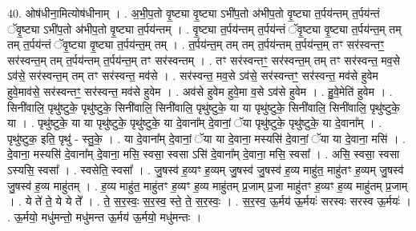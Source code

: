 \documentclass[17pt]{extarticle}
\begin{document}
40. ओष॑धीना॒मित्योष॑धीनाम् । . अ॒भी॒प॒तो वृ॒ष्ट्या वृ॒ष्ट्या ऽभी॑प॒तो अ॑भीप॒तो वृ॒ष्ट्या त॒र्पय॑न्तम् त॒र्पय॑न्तं 
ॅवृ॒ष्ट्या ऽभी॑प॒तो अ॑भीप॒तो वृ॒ष्ट्या त॒र्पय॑न्तम् । . वृ॒ष्ट्या त॒र्पय॑न्तम् त॒र्पय॑न्तं ॅवृ॒ष्ट्या वृ॒ष्ट्या त॒र्पय॑न्त॒म् तम् तम् त॒र्पय॑न्तं ॅवृ॒ष्ट्या वृ॒ष्ट्या त॒र्पय॑न्त॒म् तम् । . त॒र्पय॑न्त॒म् तम् तम् त॒र्पय॑न्तम् त॒र्पय॑न्त॒म् तꣳ सर॑स्वन्तꣳ॒॒ सर॑स्वन्त॒म् तम् त॒र्पय॑न्तम् त॒र्पय॑न्त॒म् तꣳ सर॑स्वन्तम् । . तꣳ सर॑स्वन्तꣳ॒॒ सर॑स्वन्त॒म् तम् तꣳ सर॑स्वन्त॒ मव॒से ऽव॑से॒ सर॑स्वन्त॒म् तम् तꣳ सर॑स्वन्त॒ मव॑से । . सर॑स्वन्त॒ मव॒से ऽव॑से॒ सर॑स्वन्तꣳ॒॒ सर॑स्वन्त॒ मव॑से हुवेम हुवे॒माव॑से॒ सर॑स्वन्तꣳ॒॒ सर॑स्वन्त॒ मव॑से हुवेम । . अव॑से हुवेम हुवे॒मा व॒से ऽव॑से हुवेम । . हु॒वे॒मेति॑ हुवेम । . सिनी॑वालि॒ पृथु॑ष्टुके॒ पृथु॑ष्टुके॒ सिनी॑वालि॒ सिनी॑वालि॒ पृथु॑ष्टुके॒ या या पृथु॑ष्टुके॒ सिनी॑वालि॒ सिनी॑वालि॒ पृथु॑ष्टुके॒ या । . पृथु॑ष्टुके॒ या या पृथु॑ष्टुके॒ पृथु॑ष्टुके॒ या दे॒वाना᳚म् दे॒वानां॒ ॅया पृथु॑ष्टुके॒ पृथु॑ष्टुके॒ या दे॒वाना᳚म् । . पृथु॑ष्टुक॒ इति॒ पृथु॑ - स्तु॒के॒ । . या दे॒वाना᳚म् दे॒वानां॒ ॅया या दे॒वाना॒ मस्यसि॑ दे॒वानां॒ ॅया या दे॒वाना॒ मसि॑ । . दे॒वाना॒ मस्यसि॑ दे॒वाना᳚म् दे॒वाना॒ मसि॒ स्वसा॒ स्वसा ऽसि॑ दे॒वाना᳚म् दे॒वाना॒ मसि॒ स्वसा᳚ । . असि॒ स्वसा॒ स्वसा ऽस्यसि॒ स्वसा᳚ । . स्वसेति॒ स्वसा᳚ । . जु॒षस्व॑ ह॒व्यꣳ ह॒व्यम् जु॒षस्व॑ जु॒षस्व॑ ह॒व्य माहु॑त॒ माहु॑तꣳ ह॒व्यम् जु॒षस्व॑ जु॒षस्व॑ ह॒व्य माहु॑तम् । . ह॒व्य माहु॑त॒ माहु॑तꣳ ह॒व्यꣳ ह॒व्य माहु॑तम् प्र॒जाम् प्र॒जा माहु॑तꣳ ह॒व्यꣳ ह॒व्य माहु॑तम् प्र॒जाम् । . ये ते॑ ते॒ ये ये ते᳚ । . ते॒ स॒र॒स्वः॒ स॒र॒स्व॒ स्ते॒ ते॒ स॒र॒स्वः॒ । . स॒र॒स्व॒ ऊ॒र्मय॑ ऊ॒र्मयः॑ सरस्वः सरस्व ऊ॒र्मयः॑ । . ऊ॒र्मयो॒ मधु॑मन्तो॒ मधु॑मन्त ऊ॒र्मय॑ ऊ॒र्मयो॒ मधु॑मन्तः । \newline
\end{document}
